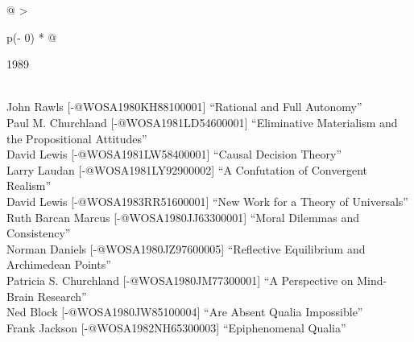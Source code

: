 \documentclass[
  10pt,
  letterpaper,
  DIV=11,
  numbers=noendperiod,
  twoside]{scrartcl}
\begin{document}
\begin{longtable}[]{@{}
  >{\raggedright\arraybackslash}p{(\columnwidth - 0\tabcolsep) * }@{}}

\caption{\label{tbl-top-ten-1980}Most cited articles published less than
ten years ago as of 1989.}

\tabularnewline

\toprule\noalign{}
\begin{minipage}[b]{\linewidth}\raggedright
1989
\end{minipage} \\
\midrule\noalign{}
\endhead
\bottomrule\noalign{}
\endlastfoot
John Rawls {[}-@WOSA1980KH88100001{]} ``Rational and Full Autonomy'' \\
Paul M. Churchland {[}-@WOSA1981LD54600001{]} ``Eliminative Materialism
and the Propositional Attitudes'' \\
David Lewis {[}-@WOSA1981LW58400001{]} ``Causal Decision Theory'' \\
Larry Laudan {[}-@WOSA1981LY92900002{]} ``A Confutation of Convergent
Realism'' \\
David Lewis {[}-@WOSA1983RR51600001{]} ``New Work for a Theory of
Universals'' \\
Ruth Barcan Marcus {[}-@WOSA1980JJ63300001{]} ``Moral Dilemmas and
Consistency'' \\
Norman Daniels {[}-@WOSA1980JZ97600005{]} ``Reflective Equilibrium and
Archimedean Points'' \\
Patricia S. Churchland {[}-@WOSA1980JM77300001{]} ``A Perspective on
Mind-Brain Research'' \\
Ned Block {[}-@WOSA1980JW85100004{]} ``Are Absent Qualia Impossible'' \\
Frank Jackson {[}-@WOSA1982NH65300003{]} ``Epiphenomenal Qualia'' \\

\end{longtable}
\end{document}
